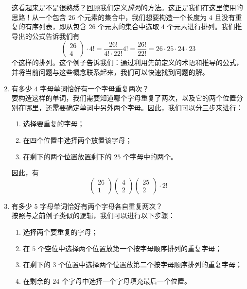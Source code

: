 \begin{example}
\begin{enumerate}
              这看起来是不是很熟悉？回顾我们定义\emph{排列}的方法。这正是我们在这里使用的思路！从一个包含 $26$ 个元素的集合中，我们想要构造一个长度为 $4$ 且没有重复的有序列表，即从包含 $26$ 个元素的集合中选取 $4$ 个元素进行排列。我们推导出的公式告诉我们有
              \[\begin{pmatrix} 26\\4 \end{pmatrix} \cdot 4! = \frac{26!}{4! \cdot 22!} 4! = \frac{26!}{22!} = 26 \cdot 25 \cdot 24 \cdot 23\]
              个这样的排列。这个例子告诉我们：通过利用先前定义的术语和推导的公式，并将当前问题与这些概念联系起来，我们可以快速找到问题的解。
        \item 有多少 $4$ 字母单词恰好有一个字母重复两次？\\
              要构造这样的单词，我们需要知道哪个字母重复了两次，以及它的两个位置分别在哪里，还需要确定单词中另外两个字母。因此，我们可以分三步来进行：
              \begin{enumerate}[label=(\arabic*)]
                  \item 选择要重复的字母；
                  \item 在四个位置中选择两个放置该字母；
                  \item 在剩下的两个位置放置剩下的 $25$ 个字母中的两个。
              \end{enumerate}
              因此，有
              \[\begin{pmatrix} 26\\1 \end{pmatrix}\begin{pmatrix} 4\\2 \end{pmatrix}\begin{pmatrix} 25\\2 \end{pmatrix} \cdot 2!\]
        \item 有多少 $5$ 字母单词恰好有两个字母各自重复两次？\\
              按照与之前例子类似的逻辑，我们可以进行以下步骤：
              \begin{enumerate}[label=(\arabic*)]
                  \item 选择两个要重复的字母；
                  \item 在 $5$ 个空位中选择两个位置放第一个按字母顺序排列的重复字母；
                  \item 在剩下的 $3$ 个位置中选择两个位置放第二个按字母顺序排列的重复字母；
                  \item 在剩余的 $24$ 个字母中选择一个字母填充最后一个位置。

\end{enumerate}
\end{enumerate}
\end{example}
